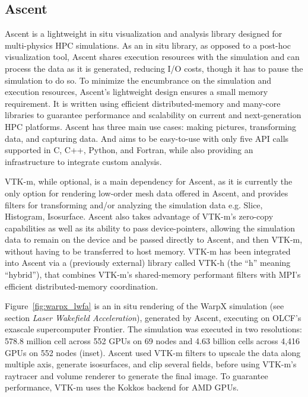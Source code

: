 \subsection{Ascent}
Ascent is a lightweight in situ visualization and analysis library designed for multi-physics HPC simulations. As an in situ library, as opposed to a post-hoc visualization tool, Ascent shares execution resources with the simulation and can process the data as it is generated, reducing I/O costs, though it has to pause the simulation to do so. To minimize the encumbrance on the simulation and execution resources, Ascent’s lightweight design ensures a small memory requirement. It is written using efficient distributed-memory and many-core libraries to guarantee performance and scalability on current and next-generation HPC platforms. Ascent has three main use cases: making pictures, transforming data, and capturing data. And aims to be easy-to-use with only five API calls supported in C, C++, Python, and Fortran, while also providing an infrastructure to integrate custom analysis.

VTK-m, while optional, is a main dependency for Ascent, as it is currently the only option for rendering low-order mesh data offered in Ascent, and provides filters for transforming and/or analyzing the simulation data e.g. Slice, Histogram, Isosurface. Ascent also takes advantage of VTK-m’s zero-copy capabilities as well as its ability to pass device-pointers, allowing the simulation data to remain on the device and be passed directly to Ascent, and then VTK-m, without having to be transferred to host memory. VTK-m has been integrated into Ascent via a (previously external) library called VTK-h (the “h” meaning “hybrid”), that combines VTK-m’s shared-memory performant filters with MPI’s efficient distributed-memory coordination. 

Figure~\ref{fig:warpx_lwfa} is an in situ rendering of the WarpX simulation (see section \textit{Laser Wakefield Acceleration}), generated by Ascent, executing on OLCF's exascale supercomputer Frontier.
The simulation was executed in two resolutions: 578.8 million cell across 552 GPUs on 69 nodes and 4.63 billion cells across 4,416 GPUs on 552 nodes (inset).
Ascent used VTK-m filters to upscale the data along multiple axis, generate isosurfaces, and clip several fields, before using VTK-m's raytracer and volume renderer to generate the final image.
To guarantee performance, VTK-m uses the Kokkos backend for AMD GPUs. 

